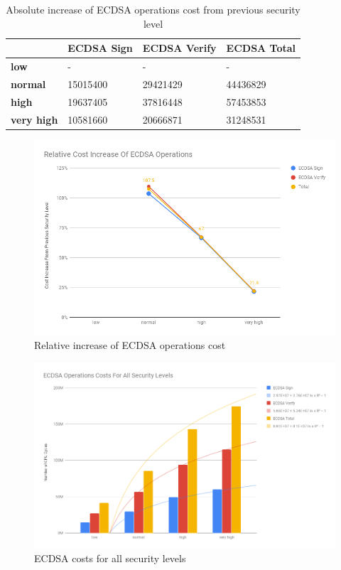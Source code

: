 \documentclass{llncs}
\begin{document}
\begin{table}[]
\begin{tabular}{|l|l|l|l|}
\hline
                   & \textbf{ECDSA Sign} & \textbf{ECDSA Verify} & \textbf{ECDSA Total} \\ \hline
\textbf{low}       & -                   & -                     & -                    \\ \hline
\textbf{normal}    & 15015400            & 29421429              & 44436829             \\ \hline
\textbf{high}      & 19637405            & 37816448              & 57453853             \\ \hline
\textbf{very high} & 10581660            & 20666871              & 31248531             \\ \hline
\end{tabular}
\centering \caption{\label{table:ecdsa-absolute-cost-increase} Absolute increase of ECDSA operations cost from previous security level}
\end{table}

\begin{figure}
  \centering
  \includegraphics[width=1.0\textwidth]{img/ecdsa_realtive_cost_increase.png}
  \centering \caption{\label{fig:ecdsa-relative-cost-incerase} Relative increase of ECDSA operations cost}
\end{figure}

\begin{figure}
  \centering
  \includegraphics[width=1.0\textwidth]{img/ecdsa_cost_all_sls.png}
  \centering \caption{\label{fig:ecdsa-costs-all-sls} ECDSA costs for all security levels}
\end{figure}
\end{document}
